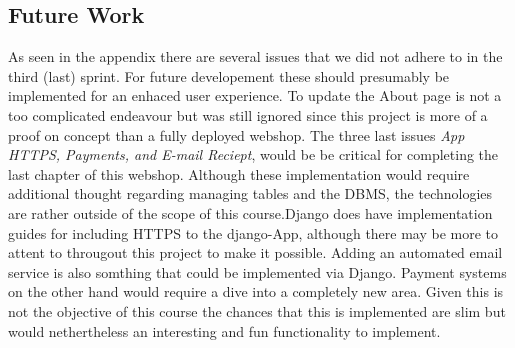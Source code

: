 \subsection{Future Work} 

As seen in the appendix there are several issues that we did not adhere to in the third (last) sprint. For future developement these should presumably be implemented for an enhaced user experience. To update the About page is not a too complicated endeavour but was still ignored since this project is more of a proof on concept than a fully deployed webshop. The three last issues \textit{App HTTPS, Payments, and E-mail Reciept}, would be be critical for completing the last chapter of this webshop. Although these implementation would require additional thought regarding managing tables and the DBMS, the technologies are rather outside of the scope of this course.Django does have implementation guides for including HTTPS to the django-App, although there may be more to attent to througout this project to make it possible. Adding an automated email service is also somthing that could be implemented via Django. Payment systems on the other hand would require a dive into a completely new area. Given this is not the objective of this course the chances that this is implemented are slim but would nethertheless an interesting and fun functionality to implement. 

